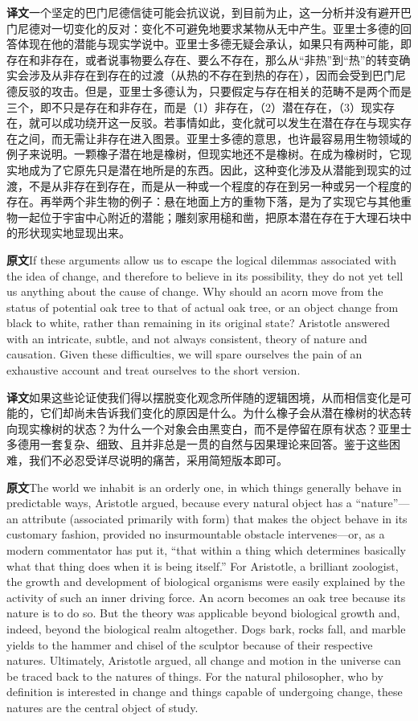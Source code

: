 \documentclass[UTF8,zihao=-4]{ctexart}
\newcommand{\BodyFont}{\fontsize{10.5pt}{15.5pt}\selectfont}
\newcommand{\origlabel}{\textbf{原文}\quad}
\newcommand{\translabel}{\textbf{译文}\quad}
\newcommand{\orig}{\par\noindent\begingroup\BodyFont\origlabel}
\newcommand{\zhline}[1]{\par\endgroup\noindent\begingroup\BodyFont\translabel #1\par\endgroup\vspace{0.35em}}
\begin{document}
\zhline{一个坚定的巴门尼德信徒可能会抗议说，到目前为止，这一分析并没有避开巴门尼德对一切变化的反对：变化不可避免地要求某物从无中产生。亚里士多德的回答体现在他的潜能与现实学说中。亚里士多德无疑会承认，如果只有两种可能，即存在和非存在，或者说事物要么存在、要么不存在，那么从“非热”到“热”的转变确实会涉及从非存在到存在的过渡（从热的不存在到热的存在），因而会受到巴门尼德反驳的攻击。但是，亚里士多德认为，只要假定与存在相关的范畴不是两个而是三个，即不只是存在和非存在，而是（1）非存在，（2）潜在存在，（3）现实存在，就可以成功绕开这一反驳。若事情如此，变化就可以发生在潜在存在与现实存在之间，而无需让非存在进入图景。亚里士多德的意思，也许最容易用生物领域的例子来说明。一颗橡子潜在地是橡树，但现实地还不是橡树。在成为橡树时，它现实地成为了它原先只是潜在地所是的东西。因此，这种变化涉及从潜能到现实的过渡，不是从非存在到存在，而是从一种或一个程度的存在到另一种或另一个程度的存在。再举两个非生物的例子：悬在地面上方的重物下落，是为了实现它与其他重物一起位于宇宙中心附近的潜能；雕刻家用槌和凿，把原本潜在存在于大理石块中的形状现实地显现出来。}

\orig If these arguments allow us to escape the logical dilemmas associated with the idea of change, and therefore to believe in its possibility, they do not yet tell us anything about the cause of change. Why should an acorn move from the status of potential oak tree to that of actual oak tree, or an object change from black to white, rather than remaining in its original state? Aristotle answered with an intricate, subtle, and not always consistent, theory of nature and causation. Given these difficulties, we will spare ourselves the pain of an exhaustive account and treat ourselves to the short version.

\zhline{如果这些论证使我们得以摆脱变化观念所伴随的逻辑困境，从而相信变化是可能的，它们却尚未告诉我们变化的原因是什么。为什么橡子会从潜在橡树的状态转向现实橡树的状态？为什么一个对象会由黑变白，而不是停留在原有状态？亚里士多德用一套复杂、细致、且并非总是一贯的自然与因果理论来回答。鉴于这些困难，我们不必忍受详尽说明的痛苦，采用简短版本即可。}

\orig The world we inhabit is an orderly one, in which things generally behave in predictable ways, Aristotle argued, because every natural object has a ``nature''---an attribute (associated primarily with form) that makes the object behave in its customary fashion, provided no insurmountable obstacle intervenes---or, as a modern commentator has put it, ``that within a thing which determines basically what that thing does when it is being itself.'' For Aristotle, a brilliant zoologist, the growth and development of biological organisms were easily explained by the activity of such an inner driving force. An acorn becomes an oak tree because its nature is to do so. But the theory was applicable beyond biological growth and, indeed, beyond the biological realm altogether. Dogs bark, rocks fall, and marble yields to the hammer and chisel of the sculptor because of their respective natures. Ultimately, Aristotle argued, all change and motion in the universe can be traced back to the natures of things. For the natural philosopher, who by definition is interested in change and things capable of undergoing change, these natures are the central object of study.
\end{document}
